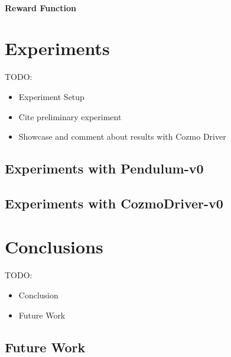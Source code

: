 \documentclass[10pt,twocolumn,letterpaper]{article}
\begin{document}
\paragraph{Reward Function}

\section{Experiments}

TODO:
\begin{itemize}
    \item Experiment Setup
    \item Cite preliminary experiment
    \item Showcase and comment about results with Cozmo Driver
\end{itemize}

\subsection{Experiments with Pendulum-v0}

\subsection{Experiments with CozmoDriver-v0}

\section{Conclusions}

TODO:
\begin{itemize}
    \item Conclusion
    \item Future Work
\end{itemize}

\subsection{Future Work}


{\small
    
    
}
\end{document}
